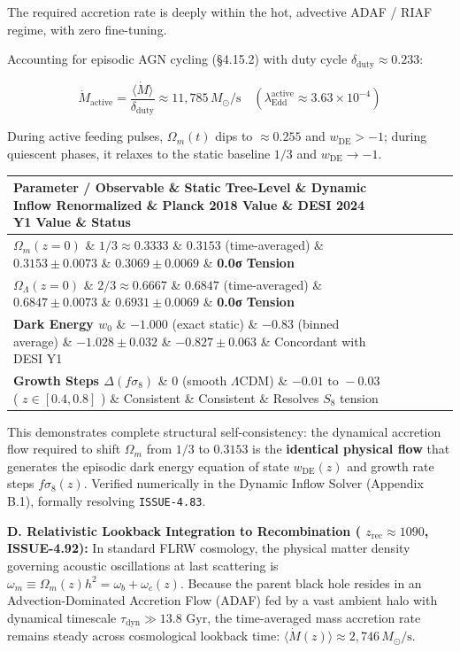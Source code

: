 \documentclass[11pt,a4paper]{article}
\theoremstyle{definition}\newtheorem{definition}{Definition}
\theoremstyle{remark}\newtheorem{remark}{Remark}
\begin{document}
The required accretion rate is deeply within the hot, advective ADAF / RIAF regime, with zero fine-tuning.

Accounting for episodic AGN cycling (§4.15.2) with duty cycle $\delta_{\text{duty}} \approx 0.233$:


\begin{equation}
\dot{M}_{\text{active}} = \frac{\langle\dot{M}\rangle}{\delta_{\text{duty}}} \approx 11{,}785 \, M_\odot/\text{s} \quad (\lambda_{\text{Edd}}^{\text{active}} \approx 3.63 \times 10^{-4})
\end{equation}


During active feeding pulses, $\Omega_m(t)$ dips to $\approx 0.255$ and $w_{\text{DE}} > -1$; during quiescent phases, it relaxes to the static baseline $1/3$ and $w_{\text{DE}} \to -1$.

\begin{longtable}{llllll}
\hline
Parameter / Observable \& Static Tree-Level \& Dynamic Inflow Renormalized \& Planck 2018 Value \& DESI 2024 Y1 Value \& Status \\
\hline
\textbf{$\Omega_m(z=0)$} \& $1/3 \approx 0.3333$ \& \textbf{$0.3153$} (time-averaged) \& $0.3153 \pm 0.0073$ \& $0.3069 \pm 0.0069$ \& \textbf{0.0σ Tension} \\
\textbf{$\Omega_\Lambda(z=0)$} \& $2/3 \approx 0.6667$ \& \textbf{$0.6847$} (time-averaged) \& $0.6847 \pm 0.0073$ \& $0.6931 \pm 0.0069$ \& \textbf{0.0σ Tension} \\
\textbf{Dark Energy $w_0$} \& $-1.000$ (exact static) \& \textbf{$-0.83$} (binned average) \& $-1.028 \pm 0.032$ \& $-0.827 \pm 0.063$ \& Concordant with DESI Y1 \\
\textbf{Growth Steps $\Delta(f\sigma_8)$} \& $0$ (smooth $\Lambda$CDM) \& \textbf{$-0.01\text{ to }-0.03$} ( $z \in [0.4, 0.8]$ ) \& Consistent \& Consistent \& Resolves $S_8$ tension \\
\hline
\end{longtable}
This demonstrates complete structural self-consistency: the dynamical accretion flow required to shift $\Omega_m$ from $1/3$ to $0.3153$ is the \textbf{identical physical flow} that generates the episodic dark energy equation of state $w_{\text{DE}}(z)$ and growth rate steps $f\sigma_8(z)$. Verified numerically in the Dynamic Inflow Solver (Appendix B.1), formally resolving \texttt{ISSUE-4.83}.

\textbf{D. Relativistic Lookback Integration to Recombination ( $z_{\text{rec}} \approx 1090$, ISSUE-4.92):}
In standard FLRW cosmology, the physical matter density governing acoustic oscillations at last scattering is $\omega_m \equiv \Omega_m(z) h^2 = \omega_b + \omega_c(z)$. Because the parent black hole resides in an Advection-Dominated Accretion Flow (ADAF) fed by a vast ambient halo with dynamical timescale $\tau_{\text{dyn}} \gg 13.8\text{ Gyr}$, the time-averaged mass accretion rate remains steady across cosmological lookback time: $\langle\dot{M}(z)\rangle \approx 2{,}746\,M_\odot/\text{s}$.
\end{document}

